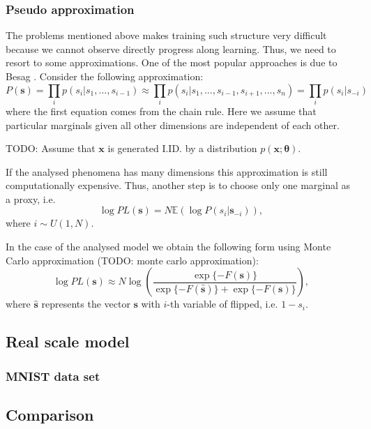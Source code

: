 \documentclass[../report/report.tex]{subfiles}
\begin{document}
\subsubsection{Pseudo approximation}
The problems mentioned above makes training such structure very difficult because we cannot observe directly progress along learning. Thus, we need to resort to some approximations. One of the most popular approaches is due to Besag \cite{besag1972nearest}.
Consider the following approximation:
\begin{equation}
P(\mathbf{s}) = \prod_i p(s_i| s_1,...,s_{i-1}) \approx \prod_i p(s_i | s_1, ..., s_{i-1}, s_{i+1},..., s_n) = \prod_i p(s_i| s_{-i})
\end{equation}
where the first equation comes from the chain rule. Here we assume that particular marginals given all other dimensions are independent of each other.
\begin{theorem}
TODO: Assume that $\mathbf{x}$ is generated I.ID. by a distribution $p(\mathbf{x};\mathbf{\theta})$.
\end{theorem}
	
If the analysed phenomena has many dimensions this approximation is still computationally expensive. Thus, another step is to choose only one marginal as a proxy, i.e.
\begin{equation}
\log PL(\mathbf{s}) = N \mathbb{E}\left(\log P(s_i | \mathbf{s}_{-i}) \right),
\end{equation}
where $i \sim U(1, N)$.

In the case of the analysed model we obtain the following form using Monte Carlo approximation (TODO: monte carlo approximation):
\begin{equation}
\log PL(\mathbf{s}) \approx N \log \left( \frac{\exp\{- F(\mathbf{s})\}}{\exp\{-F(\mathbf{\hat{s}})\} + \exp\{- F(\mathbf{s})\}} \right),
\end{equation}
where $\mathbf{\hat{s}}$ represents the vector $\mathbf{s}$ with $i$-th variable of flipped, i.e. $1-s_i$.

\subsection{Real scale model}
\subsubsection{MNIST data set}
\subsection{Comparison}
\end{document}
